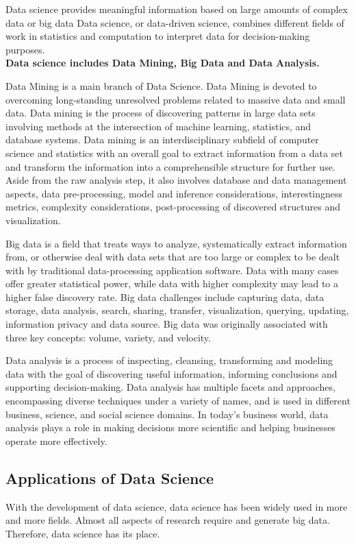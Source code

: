 \documentclass[a4paper, 11pt,twoside=true]{scrartcl}
\begin{document}
\quad Data science provides meaningful information based on large amounts of complex data or big data Data science, or data-driven science, combines different fields of work in statistics and computation to interpret data for decision-making purposes.\\
\textbf{Data science includes Data Mining, Big Data and Data Analysis.}

\quad Data Mining is a main branch of Data Science. Data Mining is devoted to overcoming long-standing unresolved problems related to massive data and small data. Data mining is the process of discovering patterns in large data sets involving methods at the intersection of machine learning, statistics, and database systems. Data mining is an interdisciplinary subfield of computer science and statistics with an overall goal to extract information from a data set and transform the information into a comprehensible structure for further use. Aside from the raw analysis step, it also involves database and data management aspects, data pre-processing, model and inference considerations, interestingness metrics, complexity considerations, post-processing of discovered structures and visualization.

\quad Big data is a field that treats ways to analyze, systematically extract information from, or otherwise deal with data sets that are too large or complex to be dealt with by traditional data-processing application software. Data with many cases offer greater statistical power, while data with higher complexity may lead to a higher false discovery rate. Big data challenges include capturing data, data storage, data analysis, search, sharing, transfer, visualization, querying, updating, information privacy and data source. Big data was originally associated with three key concepts: volume, variety, and velocity.

\quad Data analysis is a process of inspecting, cleansing, transforming and modeling data with the goal of discovering useful information, informing conclusions and supporting decision-making. Data analysis has multiple facets and approaches, encompassing diverse techniques under a variety of names, and is used in different business, science, and social science domains. In today's business world, data analysis plays a role in making decisions more scientific and helping businesses operate more effectively.

\subsection{Applications of Data Science}
\qquad With the development of data science, data science has been widely used in more and more fields. Almost all aspects of research require and generate big data. Therefore, data science has its place.
\end{document}
